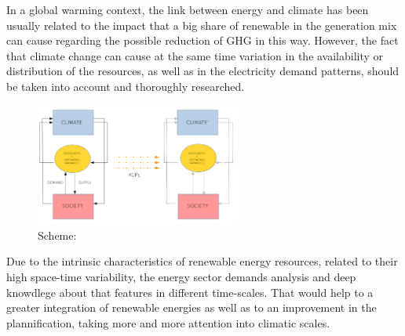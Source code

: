 In a global warming context, the link between energy and climate has been usually related to the impact that a big share of renewable in the generation mix can cause regarding the possible reduction of GHG in this way. However, the fact that climate change can cause at the same time variation in the availability or distribution of the resources, as well as in the electricity demand patterns, should be taken into account and thoroughly researched. 

\begin{figure}[h!]
\centering\includegraphics[width=0.6\textwidth]{figs/esquema.pdf}
\caption{Scheme: }
\label{fig:feedback}
\end{figure}


Due to the intrinsic characteristics of renewable energy resources, related to their high space-time variability, the energy sector demands analysis and deep knowdlege about that features in different time-scales. That would help to a greater integration of renewable energies as well as to an improvement in the plannification, taking more and more attention into climatic scales.


